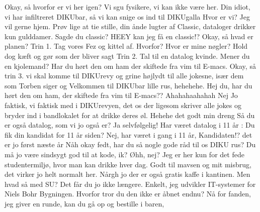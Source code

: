 \documentclass[a4paper,11pt]{article}
\begin{document}
\begin{sketch}

 Okay, så hvorfor er vi her igen? Vi sgu fysikere, vi kan ikke være her.
 Din idiot, vi har infiltreret DIKUbar, så vi kan snige os ind til DIKUgalla
 Hvor er vi? Jeg vil gerne hjem.
 Prøv lige at tie stille, din ånde lugter af Classic, dataloger drikker kun gulddamer.
 Sagde du classic? HEEY kan jeg få en classic!?
 Okay, så hvad er planen?
 Trin 1. Tag vores Fez og kittel af.
 Hvorfor? Hvor er mine nøgler?
 Hold dog kæft og gør som der bliver sagt 
 Trin 2. Tal til en datalog kvinde.
 Mener du en kjolemand?
 Har du hørt den om ham der skiftede fra vim til E-macs.
 Okay, så trin 3. vi skal komme til DIKUrevy og grine højlydt til alle jokesne, især dem som Torben siger og
 Velkommen til DIKUbar lille rus, hehehehe. Hej du, har du hørt den om ham, der skiftede fra vim til E-macs?? Ahahahaahahah
 Nej
 Jo faktisk, vi faktisk med i DIKUrevyen, det os der ligesom skriver alle jokes og bryder ind i bandlokalet for at drikke deres øl.
 Hehehe det godt min dreng
 Så du er også datalog, som vi jo også er?
 Ja selvfølgelig! Har været datalog i 11 år
: Du fik din kandidat for 11 år siden?
 Nej, har været i gang i 11 år, Kandidaten!? det er jo først næste år
 Nåh okay fedt, har du så nogle gode råd til os DIKU rus? Du må jo være sindsygt god til at kode, ik?
 Øhh, nej? Jeg er her kun for det fede studentermiljø, hvor man kan drikke hver dag. Godt til mavsen og mit misbrug, det virker jo helt normalt her. Nårgh jo der er også gratis kaffe i kantinen.
 Men hvad så med SU? Det får du jo ikke længere.
 Enkelt, jeg udvikler IT-systemer for Niels Bohr Bygningen. Hvorfor tror du den ikke er åbnet endnu?
 Nå for fanden, jeg giver en runde, kan du gå op og bestille i baren, 

\end{sketch}
\end{document}
